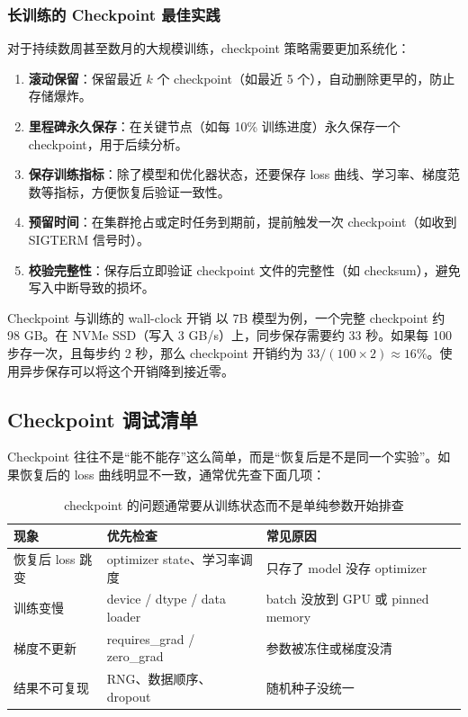 \documentclass[a4paper]{article}
\begin{document}
\subsubsection{长训练的 Checkpoint 最佳实践}

对于持续数周甚至数月的大规模训练，checkpoint 策略需要更加系统化：

\begin{enumerate}
    \item \textbf{滚动保留}：保留最近 $k$ 个 checkpoint（如最近 5 个），自动删除更早的，防止存储爆炸。
    \item \textbf{里程碑永久保存}：在关键节点（如每 10\% 训练进度）永久保存一个 checkpoint，用于后续分析。
    \item \textbf{保存训练指标}：除了模型和优化器状态，还要保存 loss 曲线、学习率、梯度范数等指标，方便恢复后验证一致性。
    \item \textbf{预留时间}：在集群抢占或定时任务到期前，提前触发一次 checkpoint（如收到 SIGTERM 信号时）。
    \item \textbf{校验完整性}：保存后立即验证 checkpoint 文件的完整性（如 checksum），避免写入中断导致的损坏。
\end{enumerate}

\begin{knowledgebox}{Checkpoint 与训练的 wall-clock 开销}
以 7B 模型为例，一个完整 checkpoint 约 98 GB。在 NVMe SSD（写入 3 GB/s）上，同步保存需要约 33 秒。如果每 100 步存一次，且每步约 2 秒，那么 checkpoint 开销约为 $33 / (100 \times 2) \approx 16\%$。使用异步保存可以将这个开销降到接近零。
\end{knowledgebox}

\subsection{Checkpoint 调试清单}

Checkpoint 往往不是“能不能存”这么简单，而是“恢复后是不是同一个实验”。如果恢复后的 loss 曲线明显不一致，通常优先查下面几项：

\begin{table}[H]
\centering
\begin{tabular}{p{}p{}p{}}
\toprule
\textbf{现象} & \textbf{优先检查} & \textbf{常见原因} \\
\midrule
恢复后 loss 跳变 & optimizer state、学习率调度 & 只存了 model 没存 optimizer \\
训练变慢 & device / dtype / data loader & batch 没放到 GPU 或 pinned memory \\
梯度不更新 & requires\_grad / zero\_grad & 参数被冻住或梯度没清 \\
结果不可复现 & RNG、数据顺序、dropout & 随机种子没统一 \\
\bottomrule
\end{tabular}
\caption{checkpoint 的问题通常要从训练状态而不是单纯参数开始排查}
\end{table}
\end{document}
